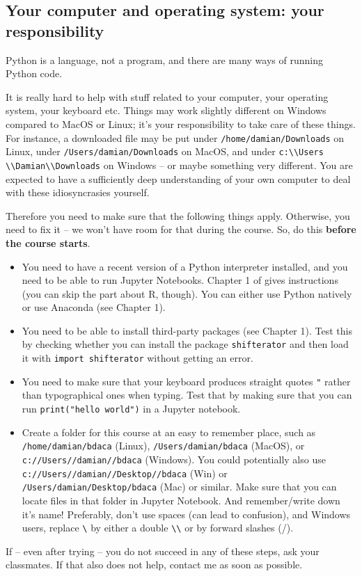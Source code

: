 \documentclass[a4paper,10pt,twocolumn]{report}
\newenvironment{corona}{%
	\begin{shaded*}%
	}{%
	\end{shaded*}%
}
\begin{document}
\begin{corona}
\section{Your computer and operating system: your responsibility}	
\label{sec:yourcomputer}
Python is a language, not a program, and there are many ways of running Python code. 

It is really hard to help with stuff related to your computer, your operating system, your keyboard etc. Things may work slightly different on Windows compared to MacOS or Linux; it's your responsibility to take care of these things. For instance, a downloaded file may be put under \texttt{/home/damian/Downloads} on Linux, under \texttt{/Users/damian/Downloads} on MacOS, and under \texttt{c:\textbackslash \textbackslash Users \textbackslash \textbackslash Damian\textbackslash \textbackslash Downloads} on Windows -- or maybe something very different. You are expected to have a sufficiently deep understanding of your own computer to deal with these idiosyncrasies yourself.

Therefore you need to make sure that the following things apply. Otherwise, you need to fix it -- we won't have room for that during the course. So, do this \textbf{before the course starts}.

\begin{itemize}
\item You need to have a recent version of a Python interpreter installed, and you need to be able to run Jupyter Notebooks. Chapter 1 of \cite{cssbook} gives instructions (you can skip the part about R, though). You can either use Python natively or use Anaconda (see Chapter 1).
	\item You need to be able to install third-party packages (see Chapter 1). Test this by checking whether you can install the package \texttt{shifterator} and then load it with \texttt{import shifterator} without getting an error.
	\item You need to make sure that your keyboard produces straight quotes \texttt{"} rather than typographical ones when typing. Test that by making sure that you can run \texttt{print("hello world")} in a Jupyter notebook.
	\item Create a folder for this course at an easy to remember place, such as \texttt{/home/damian/bdaca} (Linux), \texttt{/Users/damian/bdaca} (MacOS), or \texttt{c://Users//damian//bdaca} (Windows). You could potentially also use \texttt{c://Users//damian//Desktop//bdaca} (Win) or \texttt{/Users/damian/Desktop/bdaca} (Mac) or similar. Make sure that you can locate files in that folder in Jupyter Notebook. And remember/write down it's name! Preferably, don't use spaces (can lead to confusion), and Windows users, replace \texttt{\textbackslash} by either a double \texttt{\textbackslash \textbackslash} or by forward slashes (/).
\end{itemize}
If -- even after trying -- you do not succeed in any of these steps, ask your classmates. If that also does not help, contact me as soon as possible.


\end{corona}
\end{document}
